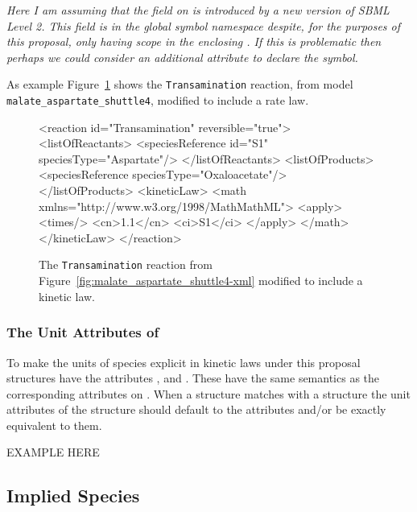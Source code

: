 \documentclass{cekarticle}
\begin{document}
\emph{Here I am assuming that the  field on  is introduced by a
new version of SBML Level 2. This  field is in the global symbol
namespace despite, for the purposes of this proposal, only having scope in the enclosing
.  If this is problematic then perhaps we could consider an additional attribute to
declare the symbol.}

As example Figure~\ref{fig:Transamination-xml} shows the \texttt{Transamination} reaction, from model
\texttt{malate\_aspartate\_shuttle4}, modified to include a rate law.

\begin{figure}[h]
\begin{example}
<reaction id="Transamination" reversible="true">
    <listOfReactants>
        <speciesReference id="S1" speciesType="Aspartate"/>
    </listOfReactants>
    <listOfProducts>
        <speciesReference speciesType="Oxaloacetate"/>
    </listOfProducts>
    <kineticLaw>
        <math xmlns="http://www.w3.org/1998/MathMathML">
            <apply>
                <times/>
                <cn>1.1</cn>
                <ci>S1</ci>
            </apply>
        </math>
    </kineticLaw>
</reaction>
\end{example}
\caption{The \texttt{Transamination} reaction from
Figure~\ref{fig:malate_aspartate_shuttle4-xml} modified to include a kinetic law.}
\label{fig:Transamination-xml}
\end{figure}

\subsubsection{The Unit Attributes of }

To make the units of species explicit in kinetic laws under this proposal
 structures have the attributes ,
 and .  These have the same semantics as
the corresponding attributes on .
When a  structure matches with a  structure
the unit attributes of the  structure should default to the
 attributes and/or be exactly equivalent to them.

EXAMPLE HERE

\subsection{Implied Species}
\end{document}
